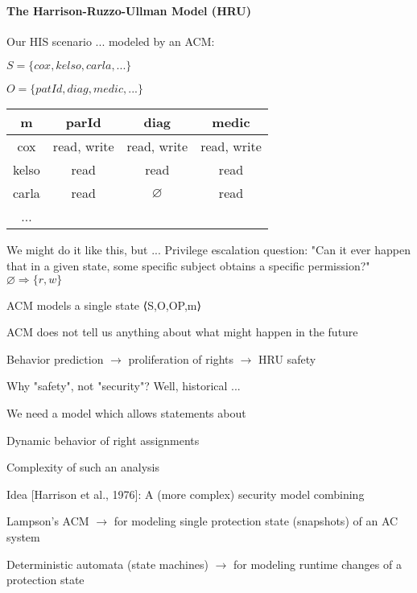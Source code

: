 \documentclass[a4paper]{article}
\begin{document}
\begin{multicols}{3}
    \paragraph{The Harrison-Ruzzo-Ullman Model (HRU)}
    Our HIS scenario ... modeled by an ACM:
    \begin{itemize*}
        \item $S=\{cox, kelso, carla,...\}$
        \item $O=\{patId, diag, medic,...\}$
    \end{itemize*}

    \begin{tabular}{c|c|c|c}
        m     & parId         & diag          & medic         \\\hline
        cox   & {read, write} & {read, write} & {read, write} \\
        kelso & {read}        & {read}        & {read}        \\
        carla & {read}        & $\varnothing$ & {read}        \\
        ...
    \end{tabular}

    We might do it like this, but ... Privilege escalation question:
    "Can it ever happen that in a given state, some specific subject obtains a specific permission?"
    $\varnothing \Rightarrow \{r,w\}$
    \begin{itemize*}
        \item ACM models a single state ⟨S,O,OP,m⟩
        \item ACM does not tell us anything about what might happen in the future
        \item Behavior prediction $\rightarrow$  proliferation of rights $\rightarrow$ HRU safety
    \end{itemize*}

    Why "safety", not "security"? Well, historical ...

    We need a model which allows statements about
    \begin{itemize*}
        \item Dynamic behavior of right assignments
        \item Complexity of such an analysis
    \end{itemize*}

    Idea [Harrison et al., 1976]: A (more complex) security model combining
    \begin{itemize*}
        \item Lampson’s ACM $\rightarrow$  for modeling single protection state (snapshots) of an AC system
        \item Deterministic automata (state machines) $\rightarrow$  for modeling runtime changes of a protection state
    \end{itemize*}


\end{multicols}
\end{document}
